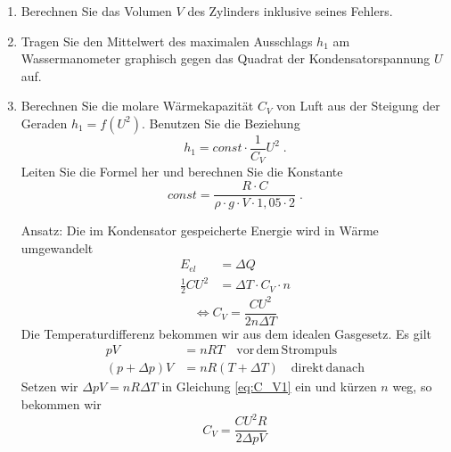 \begin{enumerate}
 \item Berechnen Sie das Volumen $V$ des Zylinders inklusive seines Fehlers.
 \item \label{v6:Graph} Tragen Sie den Mittelwert des maximalen Ausschlags $h_1$ am Wassermanometer graphisch gegen das Quadrat der Kondensatorspannung $U$ auf.
 \item Berechnen Sie die molare Wärmekapazität $C_V$ von Luft aus der Steigung der Geraden $h_1 = f(U^2)$. Benutzen Sie die Beziehung
  \begin{equation}
	 h_1 = const\cdot \frac{1}{C_V}U^2\; .  
  \end{equation}
 Leiten Sie die Formel her und berechnen Sie die Konstante
  \begin{equation}
   const = \frac{R\cdot C}{\rho\cdot g\cdot V\cdot 1,05\cdot 2}\; .
  \end{equation} 
	\begin{solution}
		Ansatz: Die im Kondensator gespeicherte Energie wird in Wärme umgewandelt
		\begin{align*}
			E_{el} &= \Delta Q\\
			\frac{1}{2}CU^2 &= \Delta T\cdot C_V\cdot n
		\end{align*}
		\begin{equation}\label{eq:C_V1}
			\Leftrightarrow C_V = \frac{CU^2}{2n\Delta T}
		\end{equation}
		Die Temperaturdifferenz bekommen wir aus dem idealen Gasgesetz. Es gilt
		\begin{align*}
			pV &= nRT\quad\mathrm{vor\, dem\, Strompuls}\\
			\left( p+\Delta p\right) V &= nR\left(T+\Delta T\right)\quad\mathrm{direkt\, danach}
		\end{align*}
		Setzen wir $\Delta pV=nR\Delta T$ in Gleichung \ref{eq:C_V1} ein und kürzen $n$ weg, so bekommen wir
		\begin{equation}\label{eq:C_V2}
			C_V=\frac{CU^2R}{2\Delta pV}
		\end{equation}
		\begin{minipage}{.3\textwidth}
			\begin{center}

\end{center}
\end{minipage}
\end{solution}
\end{enumerate}
